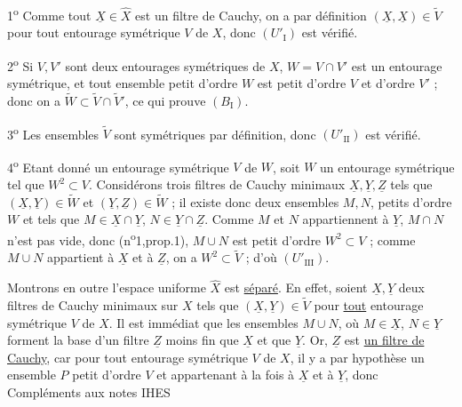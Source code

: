 1\textsuperscript{o} Comme tout $\underline{X}\in\widehat{X}$ est un filtre de
Cauchy, on a par définition $(\underline{X},\underline{X})\in\widetilde{V}$
pour tout entourage symétrique $V$ de $X$, donc $(U'_{\mathrm{I}})$ est vérifié.

2\textsuperscript{o} Si $V,V'$ sont deux entourages symétriques de $X$,
$W=V\cap V'$ est un entourage symétrique, et tout ensemble petit d'ordre $W$
est petit d'ordre $V$ et d'ordre $V'$ ; donc on a
$\widetilde{W}\subset\widetilde{V}\cap\widetilde{V}'$, ce qui prouve $(B_{\mathrm{I}})$.

3\textsuperscript{o} Les ensembles $\widetilde{V}$ sont symétriques par définition,
donc $(U'_{\mathrm{II}})$ est vérifié.

4\textsuperscript{o} Etant donné un entourage symétrique $V$ de $W$, soit $W$ un
entourage symétrique tel que $W^2\subset V$. Considérons trois filtres de Cauchy
minimaux $\underline{X},\underline{Y},\underline{Z}$ tels que
$(\underline{X},\underline{Y})\in\widetilde{W}$ et
$(\underline{Y},\underline{Z})\in\widetilde{W}$ ; il existe donc deux ensembles
$M,N$, petits d'ordre $W$ et tels que $M\in\underline{X}\cap\underline{Y}$,
$N\in\underline{Y}\cap\underline{Z}$. Comme $M$ et $N$ appartiennent à
$\underline{Y}$, $M\cap N$ n'est pas vide, donc (n\textsuperscript{o}1,prop.1),
$M\cup N$ est petit d'ordre $W^2\subset V$ ; comme $M\cup N$ appartient à
$\underline{X}$ et à $\underline{Z}$, on a $W^2\subset\widetilde{V}$ ;
d'où $(U'_{\mathrm{III}})$.

Montrons en outre l'espace uniforme $\widehat{X}$ est \uline{séparé}.
En effet, soient $\underline{X},\underline{Y}$ deux filtres de Cauchy minimaux
sur $X$ tels que $(\underline{X},\underline{Y})\in\widetilde{V}$ pour
\uline{tout} entourage symétrique $V$ de $X$. Il est immédiat que les ensembles
$M\cup N$, où $M\in\underline{X}$, $N\in\underline{Y}$ forment la base d'un
filtre $\underline{Z}$ moins fin que $\underline{X}$ et que $\underline{Y}$.
Or, $\underline{Z}$ est \uline{un filtre de Cauchy}, car pour tout entourage
symétrique $V$ de $X$, il y a par hypothèse un ensemble $P$ petit d'ordre $V$
et appartenant à la fois à $\underline{X}$ et à $\underline{Y}$, donc
Compléments aux notes IHES


